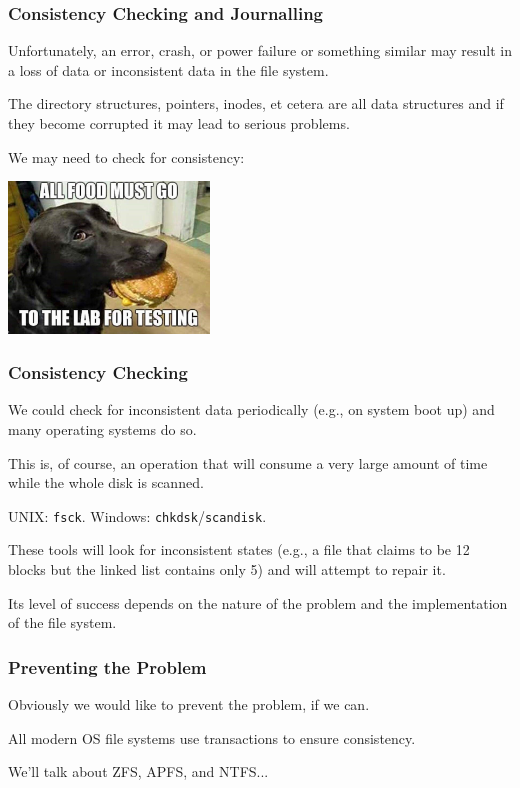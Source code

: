 \begin{frame}
\frametitle{Consistency Checking and Journalling}

Unfortunately, an error, crash, or power failure or something similar may result in a loss of data or inconsistent data in the file system. 

The directory structures, pointers, inodes, et cetera are all data structures and if they become corrupted it may lead to serious problems.

We may need to check for consistency:

\begin{center}
	\includegraphics[width=0.4\textwidth]{images/lab-testing.jpeg}
\end{center}

\end{frame}

\begin{frame}
\frametitle{Consistency Checking}

We could check for inconsistent data periodically (e.g., on system boot up) and many operating systems do so. 

This is, of course, an operation that will consume a very large amount of time while the whole disk is scanned. 

UNIX: \texttt{fsck}. Windows: \texttt{chkdsk}/\texttt{scandisk}.

These tools will look for inconsistent states (e.g., a file that claims to be 12 blocks but the linked list contains only 5) and will attempt to repair it.

Its level of success depends on the nature of the problem and the implementation of the file system.

\end{frame}



\begin{frame}
\frametitle{Preventing the Problem}

Obviously we would like to prevent the problem, if we can. 

All modern OS file systems use transactions to ensure consistency.

We'll talk about ZFS, APFS, and NTFS...

\end{frame}


